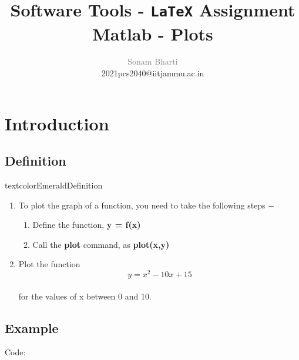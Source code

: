 \documentclass{plot-softwaremanual}
\title{Software Tools - \texttt{\LaTeX}  \vspace{}Assignment \\Matlab - Plots}
\author{{\textcolor{grey}{\btt Sonam Bharti}} \\
      {\ttfamily 2021pcs2040@iitjammu.ac.in}\hspace{}}
\begin{document}
\maketitle

\tableofcontents

\newpage

\section{Introduction}
\subsection{Definition}
textcolor{Emerald}{\btt Definition}
  \begin{enumerate}
     \item To plot the graph of a function, you need to take the following steps $-$
            \begin{enumerate}
                    \item Define the function, {\textbf{y = f(x)}}
                    \item Call the {\textbf{plot}} command, as {\textbf{plot(x,y)}}
            \end{enumerate}
            
            \item {\textbf{}} Plot the function 
            $$y = x^2 - 10x + 15 $$\\
            for the values of x between 0 and 10.\\\pause
  \end{enumerate}


\subsection{Example}

Code:\\

\vspace{\height=10}
\hspace{\height=3}

\noindent{}
\end{document}
